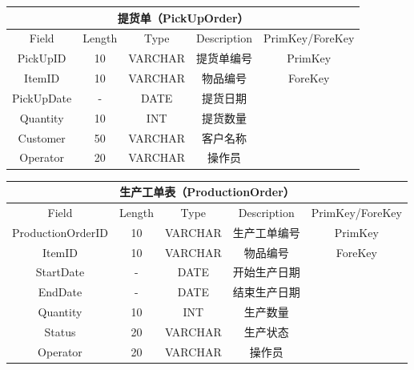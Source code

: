 \documentclass[12pt,a4paper]{article}
\begin{document}
\begin{table}[ht]
    \centering
    \begin{tabular}{|c|c|c|c|c|} 
     \hline
     \multicolumn{5}{|c|}{提货单（PickUpOrder）}\\
        \hline
            Field       & Length & Type    & Description      & PrimKey/ForeKey \\ \hline
            PickUpID & 10 & VARCHAR & 提货单编号 & PrimKey \\ \hline
ItemID & 10 & VARCHAR & 物品编号 & ForeKey \\ \hline
PickUpDate & - & DATE & 提货日期 & \\ \hline
Quantity & 10 & INT & 提货数量 & \\ \hline
Customer & 50 & VARCHAR & 客户名称 & \\ \hline
Operator & 20 & VARCHAR & 操作员 & \\ \hline
            \end{tabular}
    \label{table:6}
\end{table}

\begin{table}[h]
    \centering
    \begin{tabular}{|c|c|c|c|c|} 
     \hline
     \multicolumn{5}{|c|}{生产工单表（ProductionOrder）}\\
        \hline
            Field             & Length & Type    & Description        & PrimKey/ForeKey \\ \hline
            ProductionOrderID & 10     & VARCHAR & 生产工单编号        & PrimKey         \\ \hline
            ItemID            & 10     & VARCHAR & 物品编号            & ForeKey         \\ \hline
            StartDate         & -      & DATE    & 开始生产日期        &                 \\ \hline
            EndDate           & -      & DATE    & 结束生产日期        &                 \\ \hline
            Quantity          & 10     & INT     & 生产数量            &                 \\ \hline
            Status            & 20     & VARCHAR & 生产状态            &                 \\ \hline
            Operator          & 20     & VARCHAR & 操作员              &                 \\ \hline
            \end{tabular}
    \label{table:7}
\end{table}
\end{document}
